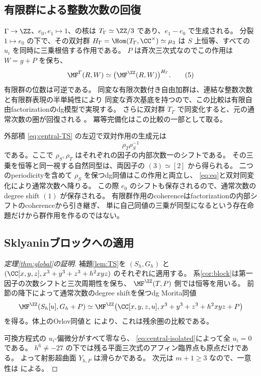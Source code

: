 \subsection{有限群による整数次数の回復}

\(\Gamma\to\ZZ\)、\(e_0,e_1\mapsto1\)、の核は
\(T_\Gamma\simeq\ZZ/3\) であり、\(e_1-e_0\) で生成される。
分裂 \(1\mapsto e_0\) の下で、その双対群
\(H_\Gamma=\Hom(T_\Gamma,\CC^\times)\simeq\mu_3\) は
\(S\) 上恒等、すべての \(u_i\) を同時に三乗根倍する作用である。
\(P\) は斉次三次式なのでこの作用は \(W=g+P\) を保ち、
\[
 \MF^\Gamma(R,W)
 \simeq\bigl(\MF^\ZZ(R,W)\bigr)^{H_\Gamma}.                \tag{5}\label{eq:eq}
\]
有限群の位数は可逆である。
同変な有限次数付き自由加群は、連結な整数次数と有限群表現の半単純性により
同変な斉次基底を持つので、この比較は有限自由factorizationのdg模型で実現する。
さらに双対群 \(T_\Gamma\) で同変化すると、元の通常次数の圏が回復される
\cite[Theorem 4.2, Section 8, Lemma 8.6, Theorem 8.9]{Elagin}。
冪等完備化はこの比較の一部として取る。

外部積 \eqref{eq:central-TS} の左辺で双対作用の生成元は
\[
 \rho_T\rho_S^{-1}
\]
である。ここで \(\rho_S,\rho_T\) はそれぞれの因子の内部次数一のシフトである。
その三乗を恒等と同一視する自然同型は、両因子の
\((3)\simeq[2]\) から得られる。
二つのperiodicityを含めて \(\rho_S\) を保つdg同値はこの作用と両立し、
\eqref{eq:eq}と双対同変化により通常次数へ降りる。
この際 \(e_0\) のシフトも保存されるので、通常次数のdegree shift \((1)\) が保存される。
有限群作用のcoherenceはfactorizationの内部シフトのcoherenceから引き継ぎ、
単に自己同値の三乗が同型になるという存在命題だけから群作用を作るのではない。

\subsection{Sklyaninブロックへの適用}

\begin{proof}[定理\ref{thm:global}の証明]
 補題\ref{lem:TS}を \((S_h,G_h)\) と
 \((\CC[x,y,z],x^3+y^3+z^3+h^2xyz)\) のそれぞれに適用する。
 系\ref{cor:block}は第一因子の次数シフトと三次周期性を保ち、
 \(\MF^\ZZ(T,P)\) 側では恒等を用いる。
 前節の降下によって通常次数のdegree shiftを保つdg Morita同値
 \[
 \MF^\ZZ(S_h[u],G_h+P)
 \simeq
 \MF^\ZZ\!\left(\CC[x,y,z,u],x^3+y^3+z^3+h^2xyz+P\right)
 \]
 を得る。体上のOrlov同値と \cite{CCKM} により、これは残余圏の比較である。

 可換方程式の \(u_i\)-偏微分がすべて零なら、
 \eqref{eq:central-isolated}によって全 \(u_i=0\) である。
 \(h^6\ne-27\) の下では残る平面三次式のアフィン臨界点も原点だけである。
 よって射影超曲面 \(Y_{h,P}\) は滑らかである。
 次元は \(m+1\ge3\) なので、一意性は \cite[Theorem 1.7]{LZ} による。
\end{proof}




